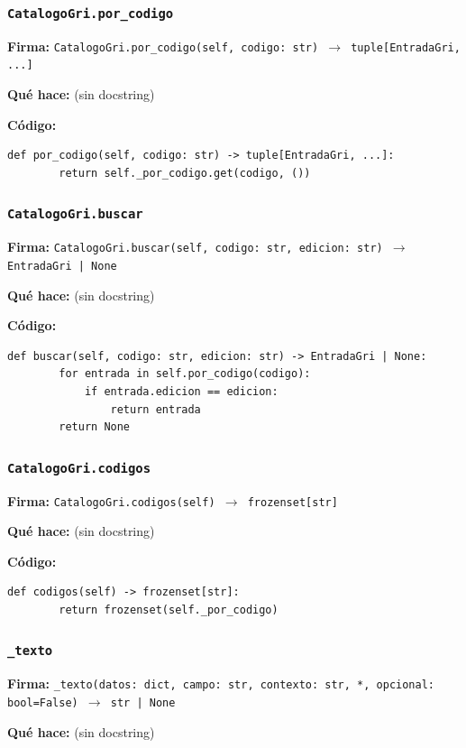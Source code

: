 \documentclass[11pt,a4paper]{article}
\begin{document}
\subsubsection*{\texttt{CatalogoGri.por\_codigo}}
\textbf{Firma:} \texttt{CatalogoGri.por\_codigo(self, codigo: str) $\rightarrow$ tuple[EntradaGri, ...]}

\textbf{Qué hace:} (sin docstring)

\textbf{Código:}
\begin{lstlisting}
def por_codigo(self, codigo: str) -> tuple[EntradaGri, ...]:
        return self._por_codigo.get(codigo, ())
\end{lstlisting}

\subsubsection*{\texttt{CatalogoGri.buscar}}
\textbf{Firma:} \texttt{CatalogoGri.buscar(self, codigo: str, edicion: str) $\rightarrow$ EntradaGri | None}

\textbf{Qué hace:} (sin docstring)

\textbf{Código:}
\begin{lstlisting}
def buscar(self, codigo: str, edicion: str) -> EntradaGri | None:
        for entrada in self.por_codigo(codigo):
            if entrada.edicion == edicion:
                return entrada
        return None
\end{lstlisting}

\subsubsection*{\texttt{CatalogoGri.codigos}}
\textbf{Firma:} \texttt{CatalogoGri.codigos(self) $\rightarrow$ frozenset[str]}

\textbf{Qué hace:} (sin docstring)

\textbf{Código:}
\begin{lstlisting}
def codigos(self) -> frozenset[str]:
        return frozenset(self._por_codigo)
\end{lstlisting}

\subsubsection*{\texttt{\_texto}}
\textbf{Firma:} \texttt{\_texto(datos: dict, campo: str, contexto: str, *, opcional: bool=False) $\rightarrow$ str | None}

\textbf{Qué hace:} (sin docstring)
\end{document}
